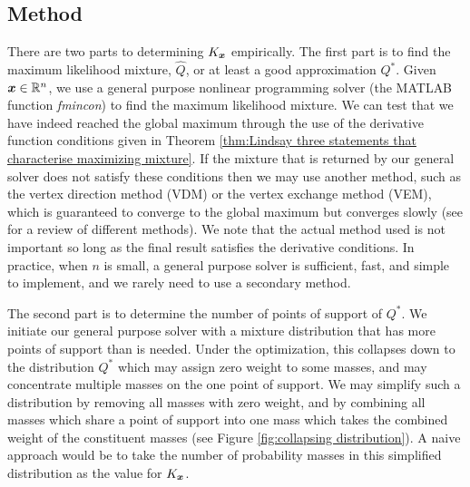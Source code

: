 	\subsection{Method}
	There are two parts to determining $K_{\bm{{x}}}$ empirically. The first part is to find the maximum likelihood mixture, $\hat{Q}$, or at least a good approximation $Q^*$. Given ${\bm{{x}}} \in \mathbb{R}^n$, we use a general purpose nonlinear programming solver (the MATLAB function \emph{fmincon}) to find the maximum likelihood mixture. We can test that we have indeed reached the global maximum through the use of the derivative function conditions given in Theorem \ref{thm:Lindsay three statements that characterise maximizing mixture}. If the mixture that is returned by our general solver does not satisfy these conditions then we may use another method, such as the vertex direction method (VDM) or the vertex exchange method (VEM), which is guaranteed to converge to the global maximum but converges slowly (see \cite{Bohning1995-di} for a review of different methods). We note that the actual method used is not important so long as the final result satisfies the derivative conditions. In practice, when $n$ is small, a general purpose solver is sufficient, fast, and simple to implement, and we rarely need to use a secondary method.

	The second part is to determine the number of points of support of $Q^*$. We initiate our general purpose solver with a mixture distribution that has more points of support than is needed. Under the optimization, this collapses down to the distribution $Q^*$ which may assign zero weight to some masses, and may concentrate multiple masses on the one point of support. We may simplify such a distribution by removing all masses with zero weight, and by combining all masses which share a point of support into one mass which takes the combined weight of the constituent masses (see Figure \ref{fig:collapsing distribution}). A naive approach would be to take the number of probability masses in this simplified distribution as the value for $K_{\bm{{x}}}$.

